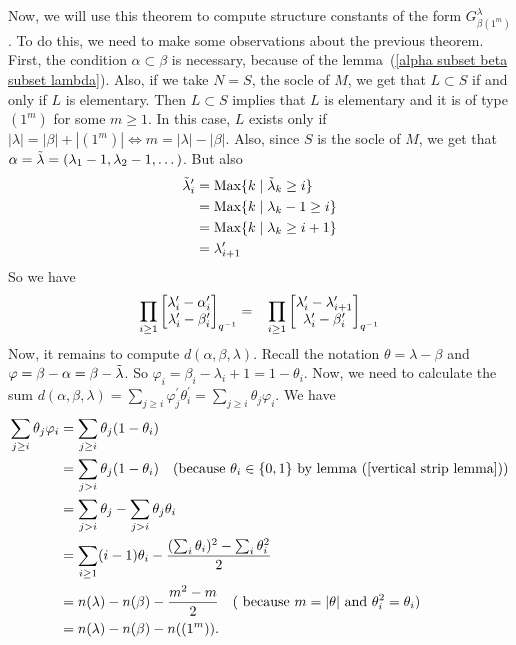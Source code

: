 Now, we will use this theorem to compute structure constants of the form $G_{\beta (1^m)}^\lambda$. To do this, 
we need to make some observations about the previous theorem. First, the condition $\alpha\subset\beta$ is necessary, 
because of the lemma~(\ref{alpha subset beta subset lambda}). Also, if we take $N=S$, the socle of $M$, 
we get that $L\subset S$ if and only if $L$ is elementary. Then $L\subset S$ implies that $L$ is elementary and 
it is of type $(1^m)$ 
for some $m\geq1$. In this case, $L$ exists only if $|\lambda|=|\beta|+|(1^m)|\iff m=|\lambda|-|\beta|$. Also, since $S$ is the socle of $M$, we get that $\alpha=\Tilde{\lambda}=(\lambda_1-1,\lambda_2-1,\dots)$. But also 
\begin{equation}
    \begin{split}
        \Tilde{\lambda}_i^\prime &= \text{Max}\{k\;|\;\Tilde{\lambda}_k\geq i\}\\
          &=\text{Max}\{k\;|\;\lambda_k-1\geq i\}\\
        &=\text{Max}\{k\;|\;\lambda_k\geq i+1\}\\
        &=\lambda_{i+1}^\prime
    \end{split}
\end{equation}
So we have
\begin{equation}
    \prod_{i\geq1}\begin{bmatrix} \lambda_i^\prime-\alpha_i^\prime\\\lambda_i^\prime-\beta_i^\prime\end{bmatrix}_{q^{-1}}=\;\;\; \prod_{i\geq1}\begin{bmatrix} \lambda_i^\prime-\lambda_{i+1}^\prime\\\lambda_i^\prime-\beta_i^\prime\end{bmatrix}_{q^{-1}}
\end{equation}
Now, it remains to compute $d(\alpha,\beta,\lambda)$. Recall the notation $\theta=\lambda-\beta$ and $\varphi=\beta-\alpha=\beta-\Tilde{\lambda}$. So $\varphi_i=\beta_i-\lambda_i+1=1-\theta_i$. Now, we need to calculate the sum $d(\alpha,\beta,\lambda)=\sum_{j\geq i}\varphi_j^\prime\theta_i^\prime=\sum_{j\geq i}\theta_j\varphi_i$. We have
\begin{equation}
    \begin{split}
        \sum_{j\geq i}\theta_j\varphi_i &= \sum_{j\geq i}\theta_j(1-\theta_i)\\
        &=\sum_{j>i}\theta_j(1-\theta_i)\quad(\text{because }\theta_i\in\{0,1\}\text{ by lemma~(\ref{vertical strip lemma})})\\
        &=\sum_{j>i}\theta_j-\sum_{j>i}\theta_j\theta_i\\
        &=\sum_{i\geq1}(i-1)\theta_i - \frac{(\sum_i\theta_i)^2-\sum_i\theta_i^2}{2}\\
        &=n(\lambda)-n(\beta)-\frac{m^2-m}{2}\quad(\text{ because } m =|\theta| \text{ and } \theta_i^2=\theta_i)\\
        &=n(\lambda)-n(\beta)-n((1^m)).
    \end{split}
\end{equation}
